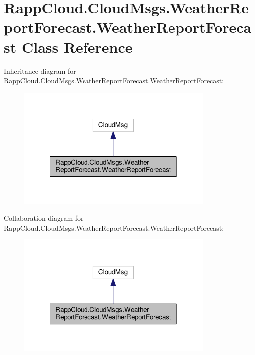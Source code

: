 \hypertarget{classRappCloud_1_1CloudMsgs_1_1WeatherReportForecast_1_1WeatherReportForecast}{\section{Rapp\-Cloud.\-Cloud\-Msgs.\-Weather\-Report\-Forecast.\-Weather\-Report\-Forecast Class Reference}
\label{classRappCloud_1_1CloudMsgs_1_1WeatherReportForecast_1_1WeatherReportForecast}
}


Inheritance diagram for Rapp\-Cloud.\-Cloud\-Msgs.\-Weather\-Report\-Forecast.\-Weather\-Report\-Forecast\-:
\nopagebreak
\begin{figure}[H]
\begin{center}
\leavevmode
\includegraphics[width=270pt]{classRappCloud_1_1CloudMsgs_1_1WeatherReportForecast_1_1WeatherReportForecast__inherit__graph}
\end{center}
\end{figure}


Collaboration diagram for Rapp\-Cloud.\-Cloud\-Msgs.\-Weather\-Report\-Forecast.\-Weather\-Report\-Forecast\-:
\nopagebreak
\begin{figure}[H]
\begin{center}
\leavevmode
\includegraphics[width=270pt]{classRappCloud_1_1CloudMsgs_1_1WeatherReportForecast_1_1WeatherReportForecast__coll__graph}
\end{center}
\end{figure}
